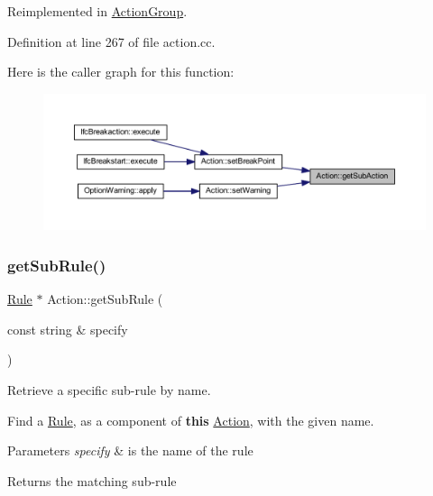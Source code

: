 Reimplemented in \mbox{\hyperlink{class_action_group_a5bf70e0947c75bb1e0c106f436027531}{Action\+Group}}.



Definition at line 267 of file action.\+cc.

Here is the caller graph for this function\+:
\nopagebreak
\begin{figure}[H]
\begin{center}
\leavevmode
\includegraphics[width=350pt]{class_action_ad7c260f28ff9705265558c3c077b9792_icgraph}
\end{center}
\end{figure}
\mbox{\label{class_action_aacd1f960b27f1b02d27a49aaa61c895a}} 
\subsubsection{\texorpdfstring{getSubRule()}{getSubRule()}}
{\footnotesize\ttfamily \mbox{\hyperlink{class_rule}{Rule}} $\ast$ Action\+::get\+Sub\+Rule (\begin{DoxyParamCaption}\item[{const string \&}]{specify }\end{DoxyParamCaption})\hspace{0.3cm}{\ttfamily [virtual]}}



Retrieve a specific sub-\/rule by name. 

Find a \mbox{\hyperlink{class_rule}{Rule}}, as a component of {\bfseries{this}} \mbox{\hyperlink{class_action}{Action}}, with the given name. 
\begin{DoxyParams}{Parameters}
{\em specify} & is the name of the rule \\
\hline
\end{DoxyParams}
\begin{DoxyReturn}{Returns}
the matching sub-\/rule 
\end{DoxyReturn}


